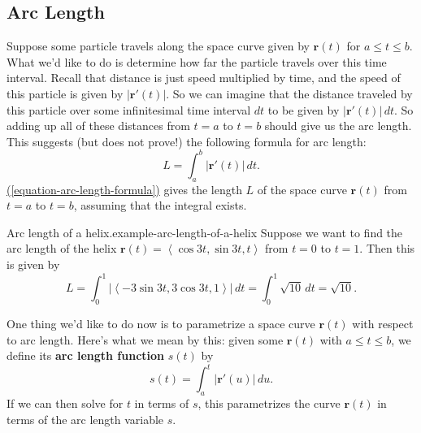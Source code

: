 \documentclass[10pt,]{book}
\newcommand{\terminology}[1]{\textbf{#1}}
\numberwithin{equation}{section}
\newcommand{\vv}[1]{\mathbf{#1}}
\newcommand{\dotprod}[1]{\left\langle #1 \right\rangle}
\begin{document}
\subsection[{Arc Length}]{Arc Length}\label{subsection-arc-length}
\hypertarget{p-1276}{}%
Suppose some particle travels along the space curve given by \(\vv{r}(t)\) for \(a\leq t\leq b\). What we'd like to do is determine how far the particle travels over this time interval. Recall that distance is just speed multiplied by time, and the speed of this particle is given by \(|\vv{r}'(t)|\). So we can imagine that the distance traveled by this particle over some infinitesimal time interval \(dt\) to be given by \(|\vv{r}'(t)|\,dt\). So adding up all of these distances from \(t=a\) to \(t=b\) should give us the arc length. This suggests (but does not prove!) the following formula for arc length:%
%
\begin{equation}
L = \int_{a}^{b}|\vv{r}'(t)|\,dt.\label{equation-arc-length-formula}
\end{equation}
\hypertarget{p-1277}{}%
\hyperref[equation-arc-length-formula]{(\ref{equation-arc-length-formula})} gives the length \(L\) of the space curve \(\vv{r}(t)\) from \(t=a\) to \(t=b\), assuming that the integral exists.%
\begin{example}{Arc length of a helix.}{example-arc-length-of-a-helix}%
\hypertarget{p-1278}{}%
Suppose we want to find the arc length of the helix \(\vv{r}(t) = \dotprod{\cos 3t,\sin 3t, t}\) from \(t=0\) to \(t=1\). Then this is given by%
%
\begin{equation*}
L = \int_{0}^{1}|\dotprod{-3\sin3t, 3\cos3t, 1}|\,dt = \int_{0}^{1}\sqrt{10}\,dt = \sqrt{10}.
\end{equation*}
\end{example}
\hypertarget{p-1279}{}%
One thing we'd like to do now is to parametrize a space curve \(\vv{r}(t)\) with respect to arc length. Here's what we mean by this: given some \(\vv{r}(t)\) with \(a\leq t\leq b\), we define its \terminology{arc length function} \(s(t)\) by%
%
\begin{equation*}
s(t) = \int_{a}^{t}|\vv{r}'(u)|\,du.
\end{equation*}
\hypertarget{p-1280}{}%
If we can then solve for \(t\) in terms of \(s\), this parametrizes the curve \(\vv{r}(t)\) in terms of the arc length variable \(s\).%
\end{document}
